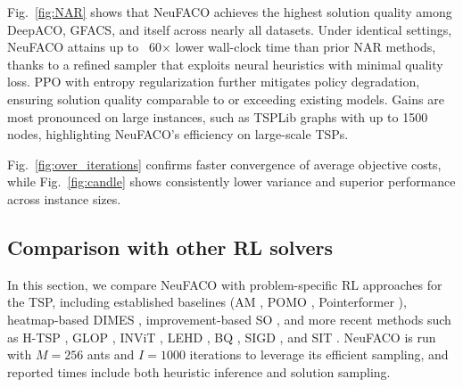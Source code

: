 \documentclass[a4paper,conference]{IEEEtran}
\begin{document}
Fig.~\ref{fig:NAR} shows that NeuFACO achieves the highest solution quality among DeepACO, GFACS, and itself across nearly all datasets. Under identical settings, NeuFACO attains up to ~60$\times$ lower wall-clock time than prior NAR methods, thanks to a refined sampler that exploits neural heuristics with minimal quality loss. PPO with entropy regularization further mitigates policy degradation, ensuring solution quality comparable to or exceeding existing models. Gains are most pronounced on large instances, such as TSPLib graphs with up to 1500 nodes, highlighting NeuFACO’s efficiency on large-scale TSPs.

Fig.~\ref{fig:over_iterations} confirms faster convergence of average objective costs, while Fig.~\ref{fig:candle} shows consistently lower variance and superior performance across instance sizes.



\subsection{Comparison with other RL solvers}
In this section, we compare NeuFACO with problem-specific RL approaches for the TSP, including established baselines (AM \cite{transformer}, POMO \cite{pomo}, Pointerformer \cite{pointerformer}), heatmap-based DIMES \cite{dimes}, improvement-based SO \cite{SelectAndOptimize}, and more recent methods such as H-TSP \cite{htsp}, GLOP \cite{glop}, INViT \cite{invit}, LEHD \cite{lehd}, BQ \cite{bq}, SIGD \cite{sigd}, and SIT \cite{sit}. NeuFACO is run with $M=256$ ants and $I=1000$ iterations to leverage its efficient sampling, and reported times include both heuristic inference and solution sampling.

\end{document}
